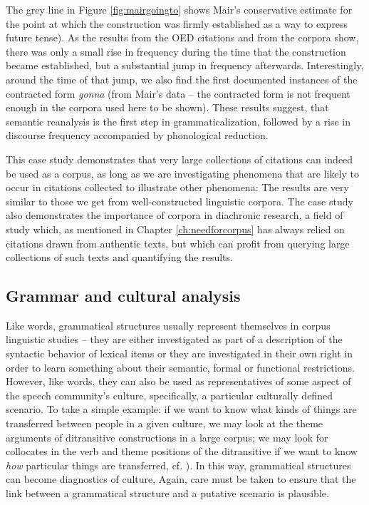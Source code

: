 The grey line in Figure \ref{fig:mairgoingto} shows Mair's conservative estimate for the point at which the construction was firmly established as a way to express future tense). As the results from the OED citations and from the corpora show, there was only a small rise in frequency during the time that the construction became established, but a substantial jump in frequency afterwards. Interestingly, around the time of that jump, we also find the first documented instances of the contracted form \textit{gonna} (from Mair's data -- the contracted form is not frequent enough in the corpora used here to be shown). These results suggest, that semantic reanalysis is the first step in grammaticalization, followed by a rise in discourse frequency accompanied by phonological reduction.

This case study demonstrates that very large collections of citations can indeed be used as a corpus, as long as we are investigating phenomena that are likely to occur in citations collected to illustrate other phenomena: The results are very similar to those we get from well-constructed linguistic corpora. The case study also demonstrates the importance of corpora in diachronic research, a field of study which, as mentioned in Chapter \ref{ch:needforcorpus} has always relied on citations drawn from authentic texts, but which can profit from querying large collections of such texts and quantifying the results.

\subsection{Grammar and cultural analysis}
\label{sec:grammarandculturalanalysis}

Like words, grammatical structures usually represent themselves in corpus linguistic studies -- they are either investigated as part of a description of the syntactic behavior of lexical items or they are investigated in their own right in order to learn something about their semantic, formal or functional restrictions. However, like words, they can also be used as representatives of some aspect of the speech community's culture, specifically, a particular culturally defined scenario. To take a simple example: if we want to know what kinds of things are transferred between people in a given culture, we may look at the theme arguments of ditransitive constructions in a large corpus; we may look for collocates in the verb and theme positions of the ditransitive if we want to know \textit{how} particular things are transferred, cf. \citet{ludeling_corpora_2009}). In this way, grammatical structures can become diagnostics of culture, Again, care must be taken to ensure that the link between a grammatical structure and a putative scenario is plausible.

